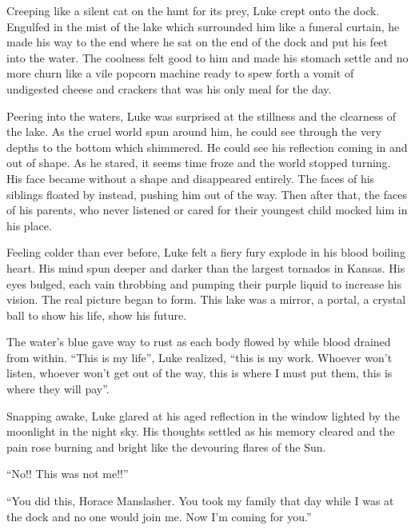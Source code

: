 Creeping like a silent cat on the hunt for its prey, Luke crept
onto the dock. Engulfed in the mist of the lake which surrounded
him like a funeral curtain, he made his way to the end where he sat
on the end of the dock and put his feet into the water. The
coolness felt good to him and made his stomach settle and no more
churn like a vile popcorn machine ready to spew forth a vomit of
undigested cheese and crackers that was his only meal for the
day.



Peering into the waters, Luke was surprised at the stillness and
the clearness of the lake. As the cruel world spun around him, he
could see through the very depths to the bottom which shimmered. He
could see his reflection coming in and out of shape. As he stared,
it seems time froze and the world stopped turning. His face became
without a shape and disappeared entirely. The faces of his siblings
floated by instead, pushing him out of the way. Then after that,
the faces of his parents, who never listened or cared for their
youngest child mocked him in his place.



Feeling colder than ever before, Luke felt a fiery fury explode in
his blood boiling heart. His mind spun deeper and darker than the
largest tornados in Kansas. His eyes bulged, each vain throbbing
and pumping their purple liquid to increase his vision. The real
picture began to form. This lake was a mirror, a portal, a crystal
ball to show his life, show his future.



The water's blue gave way to rust as each body flowed by
while blood drained from within. ``This is my life'',
Luke realized, ``this is my work. Whoever won't listen,
whoever won't get out of the way, this is where I must put
them, this is where they will pay''.



Snapping awake, Luke glared at his aged reflection in the window
lighted by the moonlight in the night sky. His thoughts settled as
his memory cleared and the pain rose burning and bright like the
devouring flares of the Sun.

``No!! This was not me!!''



``You did this, Horace Manslasher. You took my family that day while
I was at the dock and no one would join me. Now I'm coming
for you.'' 
 



